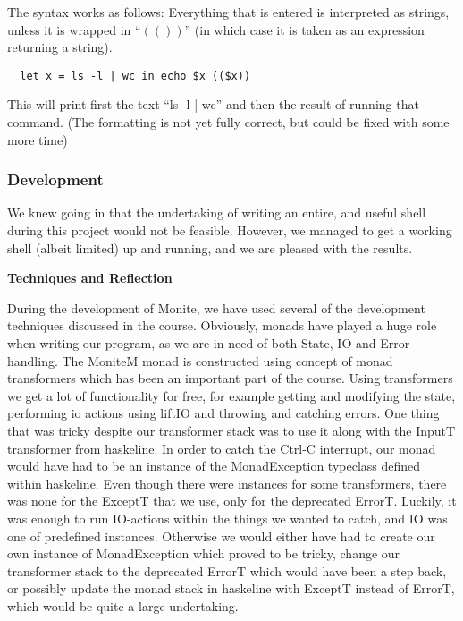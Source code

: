 \documentclass[11pt,a4paper]{article}
\begin{document}
The syntax works as follows: Everything that is entered is interpreted as
strings, unless it is wrapped in ``$\left( \left(  \right) \right)$'' (in which
case it is taken as an expression returning a string).

\begin{verbatim}
  let x = ls -l | wc in echo $x (($x))
\end{verbatim}

This will print first the text ``ls -l | wc'' and then the result of running
that command. (The formatting is not yet fully correct, but could be fixed with
some more time)

\subsubsection{Development}

We knew going in that the undertaking of writing an entire, and useful shell
during this project would not be feasible. However, we managed to get a working
shell (albeit limited) up and running, and we are pleased with the results.

\textbf{Techniques and Reflection}

During the development of Monite, we have used several of the development
techniques discussed in the course. Obviously, monads have played a huge role
when writing our program, as we are in need of both State, IO and Error
handling. The MoniteM monad is constructed using concept of monad transformers
which has been an important part of the course. Using transformers we get a lot
of functionality for free, for example getting and modifying the state,
performing io actions using liftIO and throwing and catching errors. One thing
that was tricky despite our transformer stack was to use it along with the
InputT transformer from haskeline. In order to catch the Ctrl-C interrupt, our
monad would have had to be an instance of the MonadException typeclass defined
within haskeline. Even though there were instances for some transformers, there
was none for the ExceptT that we use, only for the deprecated ErrorT. Luckily,
it was enough to run IO-actions within the things we wanted to catch, and IO was
one of predefined instances. Otherwise we would either have had to create our
own instance of MonadException which proved to be tricky, change our transformer
stack to the deprecated ErrorT which would have been a step back, or possibly
update the monad stack in haskeline with ExceptT instead of ErrorT, which would
be quite a large undertaking.
\end{document}
